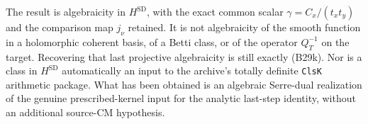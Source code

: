 The result is algebraicity in $H^{\mathrm{SD}}$, with the exact
common scalar $\gamma=C_x/(t_xt_y)$ and the comparison map
$j_\nu$ retained.  It is not algebraicity of the smooth function
in a holomorphic coherent basis, of a Betti class, or of the
operator $Q_T^{-1}$ on the target.  Recovering that last
projective algebraicity is still exactly (B29k).
Nor is a class in $H^{\mathrm{SD}}$ automatically an input to
the archive's totally definite \texttt{ClsK} arithmetic package.
What has been obtained is an algebraic Serre-dual realization of
the genuine prescribed-kernel input for the analytic last-step
identity, without an additional source-CM hypothesis.
